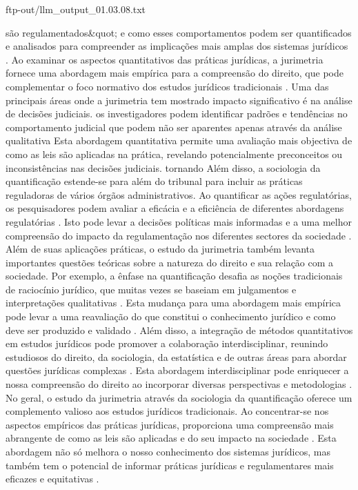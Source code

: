 \begin{agradecimentos}
    ftp-out/llm_output_01.03.08.txt 
    
    são regulamentados&quot; e como esses comportamentos podem ser quantificados e analisados para compreender as implicações mais amplas dos sistemas jurídicos \cite{smith2020jurimetrics}. Ao examinar os aspectos quantitativos das práticas jurídicas, a jurimetria fornece uma abordagem mais empírica para a compreensão do direito, que pode complementar o foco normativo dos estudos jurídicos tradicionais \cite{johnson2019sociologia}. Uma das principais áreas onde a jurimetria tem mostrado impacto significativo é na análise de decisões judiciais. os investigadores podem identificar padrões e tendências no comportamento judicial que podem não ser aparentes apenas através da análise qualitativa \cite{lee2018judicial} Esta abordagem quantitativa permite uma avaliação mais objectiva de como as leis são aplicadas na prática, revelando potencialmente preconceitos ou inconsistências nas decisões judiciais. tornando \cite{miller2017quantitativo} Além disso, a sociologia da quantificação estende-se para além do tribunal para incluir as práticas reguladoras de vários órgãos administrativos. Ao quantificar as ações regulatórias, os pesquisadores podem avaliar a eficácia e a eficiência de diferentes abordagens regulatórias \cite{brown2016regulation}. Isto pode levar a decisões políticas mais informadas e a uma melhor compreensão do impacto da regulamentação nos diferentes sectores da sociedade \cite{wilson2015policy}. Além de suas aplicações práticas, o estudo da jurimetria também levanta importantes questões teóricas sobre a natureza do direito e sua relação com a sociedade. Por exemplo, a ênfase na quantificação desafia as noções tradicionais de raciocínio jurídico, que muitas vezes se baseiam em julgamentos e interpretações qualitativas \cite{adams2014legal}. Esta mudança para uma abordagem mais empírica pode levar a uma reavaliação do que constitui o conhecimento jurídico e como deve ser produzido e validado \cite{thompson2013knowledge}. Além disso, a integração de métodos quantitativos em estudos jurídicos pode promover a colaboração interdisciplinar, reunindo estudiosos do direito, da sociologia, da estatística e de outras áreas para abordar questões jurídicas complexas \cite{green2012interdisciplinary}. Esta abordagem interdisciplinar pode enriquecer a nossa compreensão do direito ao incorporar diversas perspectivas e metodologias \cite{white2011diverse}. No geral, o estudo da jurimetria através da sociologia da quantificação oferece um complemento valioso aos estudos jurídicos tradicionais. Ao concentrar-se nos aspectos empíricos das práticas jurídicas, proporciona uma compreensão mais abrangente de como as leis são aplicadas e do seu impacto na sociedade \cite{black2010comprehensive}. Esta abordagem não só melhora o nosso conhecimento dos sistemas jurídicos, mas também tem o potencial de informar práticas jurídicas e regulamentares mais eficazes e equitativas \cite{clark2009efficient}. 
    

\end{agradecimentos}
